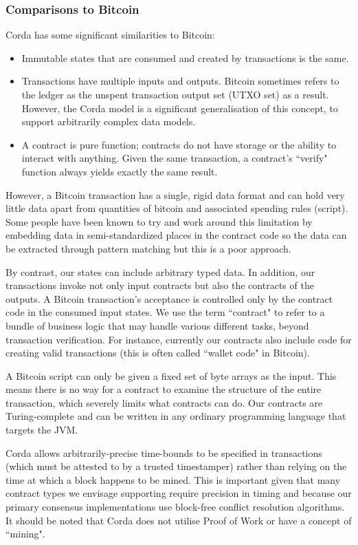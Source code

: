 \documentclass{article}
\begin{document}
\subsubsection{Comparisons to Bitcoin}
Corda has some significant similarities to Bitcoin:
\begin{itemize}
\item{Immutable states that are consumed and created by transactions is the same.}
\item{Transactions have multiple inputs and outputs. Bitcoin sometimes refers to the ledger as the unspent transaction output set (UTXO set) as a result. However, the Corda model is a significant generalisation of this concept, to support arbitrarily complex data models.}
\item{A contract is pure function; contracts do not have storage or the ability to interact with anything. Given the same transaction, a contract's ``verify" function always yields exactly the same result.}
\end{itemize}

However, a Bitcoin transaction has a single, rigid data format and can hold very little data apart from quantities of bitcoin and associated spending rules (script). Some people have been known to try and work around this limitation by embedding data in semi-standardized places in the contract code so the data can be extracted through pattern matching but this is a poor approach.

By contrast, our states can include arbitrary typed data. In addition, our transactions invoke not only input contracts but also the contracts of the outputs. A Bitcoin transaction's acceptance is controlled only by the contract code in the consumed input states. We use the term ``contract" to refer to a bundle of business logic that may handle various different tasks, beyond transaction verification. For instance, currently our contracts also include code for creating valid transactions (this is often called ``wallet code" in Bitcoin).


A Bitcoin script can only be given a fixed set of byte arrays as the input. This means there is no way for a contract to examine the structure of the entire transaction, which severely limits what contracts can do. Our contracts are Turing-complete and can be written in any ordinary programming language that targets the JVM.

Corda allows arbitrarily-precise time-bounds to be specified in transactions (which must be attested to by a trusted timestamper) rather than relying on the time at which a block happens to be mined.  This is important given that many contract types we envisage supporting require precision in timing and because our primary consensus implementations use block-free conflict resolution algorithms. It should be noted that Corda does not utilise Proof of Work or have a concept of ``mining".
\end{document}
